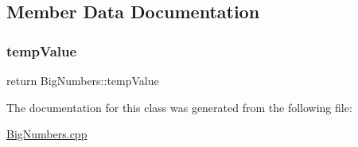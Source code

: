 \subsection{Member Data Documentation}
\mbox{\label{class_big_numbers_a308ecb6240a7159fd72fcb17f546b449}} 
\subsubsection{\texorpdfstring{temp\+Value}{tempValue}}
{\footnotesize\ttfamily return Big\+Numbers\+::temp\+Value}



The documentation for this class was generated from the following file\+:\begin{DoxyCompactItemize}
\item 
\mbox{\hyperlink{_big_numbers_8cpp}{Big\+Numbers.\+cpp}}\end{DoxyCompactItemize}
